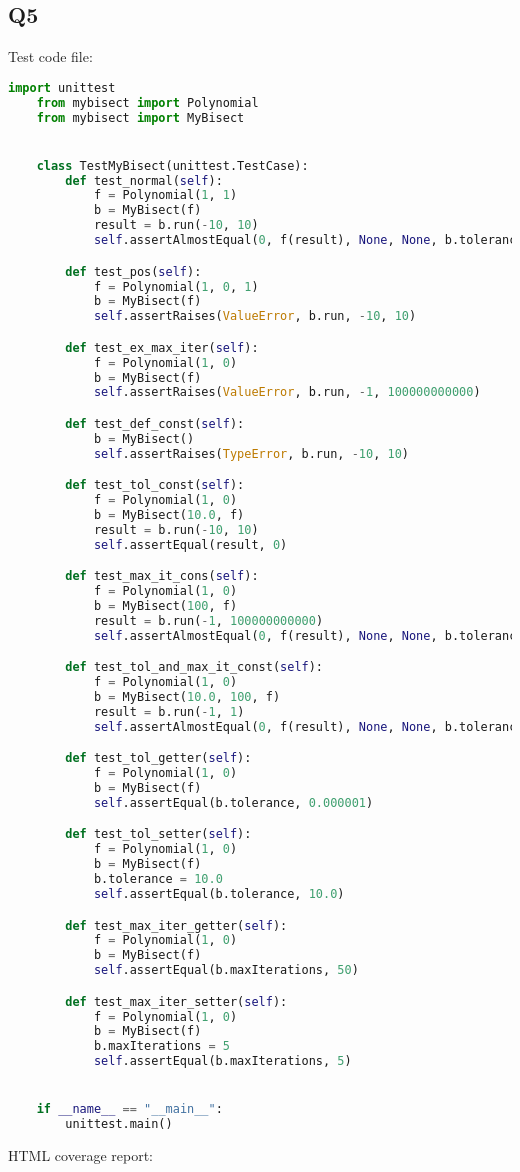 \documentclass[12pt, letterpaper, titlepage]{article}
\begin{document}
\subsection*{Q5}
Test code file:
\begin{lstlisting}[language=Python, style=code_style]
    import unittest
    from mybisect import Polynomial
    from mybisect import MyBisect


    class TestMyBisect(unittest.TestCase):
        def test_normal(self):
            f = Polynomial(1, 1)
            b = MyBisect(f)
            result = b.run(-10, 10)
            self.assertAlmostEqual(0, f(result), None, None, b.tolerance)

        def test_pos(self):
            f = Polynomial(1, 0, 1)
            b = MyBisect(f)
            self.assertRaises(ValueError, b.run, -10, 10)

        def test_ex_max_iter(self):
            f = Polynomial(1, 0)
            b = MyBisect(f)
            self.assertRaises(ValueError, b.run, -1, 100000000000)

        def test_def_const(self):
            b = MyBisect()
            self.assertRaises(TypeError, b.run, -10, 10)

        def test_tol_const(self):
            f = Polynomial(1, 0)
            b = MyBisect(10.0, f)
            result = b.run(-10, 10)
            self.assertEqual(result, 0)

        def test_max_it_cons(self):
            f = Polynomial(1, 0)
            b = MyBisect(100, f)
            result = b.run(-1, 100000000000)
            self.assertAlmostEqual(0, f(result), None, None, b.tolerance)

        def test_tol_and_max_it_const(self):
            f = Polynomial(1, 0)
            b = MyBisect(10.0, 100, f)
            result = b.run(-1, 1)
            self.assertAlmostEqual(0, f(result), None, None, b.tolerance)

        def test_tol_getter(self):
            f = Polynomial(1, 0)
            b = MyBisect(f)
            self.assertEqual(b.tolerance, 0.000001)

        def test_tol_setter(self):
            f = Polynomial(1, 0)
            b = MyBisect(f)
            b.tolerance = 10.0
            self.assertEqual(b.tolerance, 10.0)

        def test_max_iter_getter(self):
            f = Polynomial(1, 0)
            b = MyBisect(f)
            self.assertEqual(b.maxIterations, 50)

        def test_max_iter_setter(self):
            f = Polynomial(1, 0)
            b = MyBisect(f)
            b.maxIterations = 5
            self.assertEqual(b.maxIterations, 5)


    if __name__ == "__main__":
        unittest.main()
\end{lstlisting}
\newpage
HTML coverage report:
\end{document}
